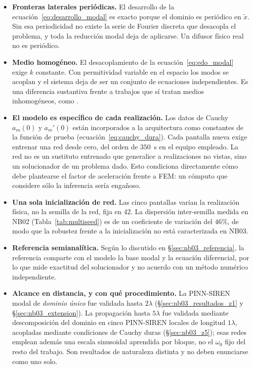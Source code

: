 \begin{itemize}
    \item \textbf{Fronteras laterales periódicas.} El desarrollo de la
    ecuación~\eqref{eq:desarrollo_modal} es exacto porque el dominio es
    periódico en $\tilde x$. Sin esa periodicidad no existe la serie de Fourier
    discreta que desacopla el problema, y toda la reducción modal deja de
    aplicarse. Un difusor físico real no es periódico.

    \item \textbf{Medio homogéneo.} El desacoplamiento de la
    ecuación~\eqref{eq:edo_modal} exige $k$ constante. Con permitividad
    variable en el espacio los modos se acoplan y el sistema deja de ser un
    conjunto de ecuaciones independientes. Es una diferencia sustantiva frente
    a trabajos que sí tratan medios inhomogéneos, como
    \textcite{panagiotakopoulos2026helmholtz}.

    \item \textbf{El modelo es específico de cada realización.} Los datos de
    Cauchy $a_m(0)$ y $a_m'(0)$ están incorporados a la arquitectura como
    constantes de la función de prueba
    (ecuación~\eqref{eq:cauchy_dura}). Cada pantalla nueva exige entrenar una
    red desde cero, del orden de $350$~s en el equipo empleado. La red no es un
    sustituto entrenado que generalice a realizaciones no vistas, sino un
    solucionador de un problema dado. Esto condiciona directamente cómo debe
    plantearse el factor de aceleración frente a FEM: un cómputo que considere
    sólo la inferencia sería engañoso.

    \item \textbf{Una sola inicialización de red.} Las cinco pantallas varían
    la realización física, no la semilla de la red, fija en $42$. La dispersión
    inter-semilla medida en NB02 (Tabla~\ref{tab:multiseed}) es de un
    coeficiente de variación del $46\%$, de modo que la robustez frente a la
    inicialización no está caracterizada en NB03.

    \item \textbf{Referencia semianalítica.} Según lo discutido en
    §\ref{sec:nb03_referencia}, la referencia comparte con el modelo la base
    modal y la ecuación diferencial, por lo que mide exactitud del solucionador
    y no acuerdo con un método numérico independiente.

    \item \textbf{Alcance en distancia, y con qué procedimiento.} La
    PINN-SIREN modal de \emph{dominio único} fue validada hasta $2\lambda$
    (§\ref{sec:nb03_resultados_z1} y §\ref{sec:nb03_extension}). La propagación
    hasta $5\lambda$ fue validada mediante descomposición del dominio en cinco
    PINN-SIREN locales de longitud $1\lambda$, acopladas mediante condiciones de
    Cauchy duras (§\ref{sec:nb03_z5}); esas redes emplean además una escala
    sinusoidal aprendida por bloque, no el $\omega_0$ fijo del resto del
    trabajo. Son resultados de naturaleza distinta y no deben enunciarse como
    uno solo.


\end{itemize}
